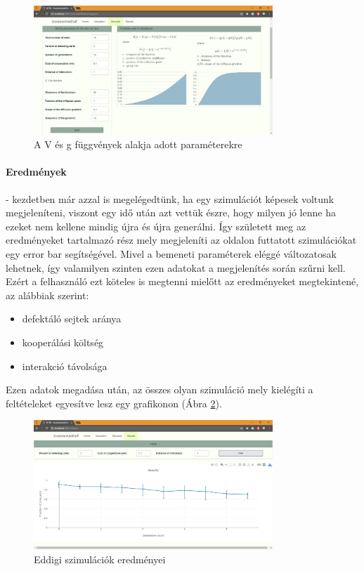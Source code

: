 \begin{figure}[ht!]
	\centering
	\includegraphics[width=90mm]{images/SimulationFunctionDiagrams}
	\vspace*{1mm}
	\caption{A V és g függvények alakja adott paraméterekre}
	\label{fig:SimulationFunctionDiagrams}
\end{figure}


\paragraph{Eredmények}- kezdetben már azzal is megelégedtünk, ha egy szimulációt képesek voltunk megjeleníteni, viszont egy idő után azt vettük észre, hogy milyen jó lenne ha ezeket nem kellene mindig újra és újra generálni. Így született meg az eredményeket tartalmazó rész mely megjeleníti az oldalon futtatott szimulációkat egy error bar segítségével. Mivel a bemeneti paraméterek eléggé változatosak lehetnek, így valamilyen szinten ezen adatokat a megjelenítés során szűrni kell. Ezért a felhasználó ezt köteles is megtenni mielőtt az eredményeket megtekintené, az alábbiak szerint:
\begin{itemize}
	\item defektáló sejtek aránya
	\item kooperálási költség 
	\item interakció távolsága
\end{itemize}
Ezen adatok megadása után, az összes olyan szimuláció mely kielégíti a feltételeket egyesítve lesz egy grafikonon (Ábra \ref{fig:SimulationResults}).

\begin{figure}[ht!]
	\centering
	\includegraphics[width=90mm]{images/SimulationResults}
	\vspace*{1mm}
	\caption{Eddigi szimulációk eredményei}
	\label{fig:SimulationResults}
\end{figure}


